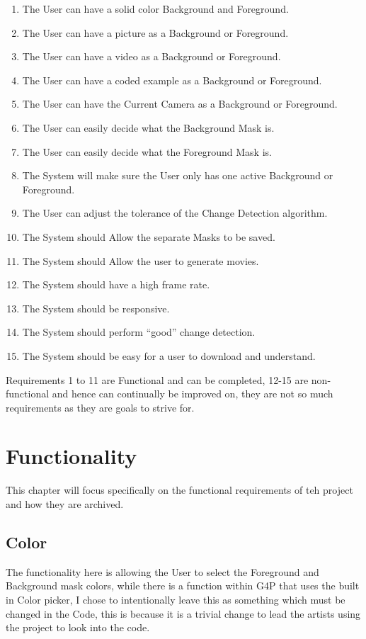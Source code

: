 \documentclass[a4paper]{report}
\begin{document}
\begin{enumerate}
\item The User can have a solid color Background and Foreground.
\item The User can have a picture as a Background or Foreground.
\item The User can have a video as a Background or Foreground.
\item The User can have a coded example as a Background or Foreground.
\item The User can have the Current Camera as a Background or Foreground.
\item The User can easily decide what the Background Mask is.
\item The User can easily decide what the Foreground Mask is.
\item The System will make sure the User only has one active Background or Foreground.
\item The User can adjust the tolerance of the Change Detection algorithm.
\item The System should Allow the separate Masks to be saved.
\item The System should Allow the user to generate movies.
\item The System should have a high frame rate.
\item The System should be responsive.
\item The System should perform “good” change detection.
\item The System should be easy for a user to download and understand.
\end{enumerate}

Requirements 1 to 11 are Functional and can be completed, 12-15 are non-functional and hence can continually be improved on, they are not so much requirements as they are goals to strive for.

\section{Functionality}
This chapter will focus specifically on the functional requirements of teh project and how they are archived.
\subsection{Color}
The functionality here is allowing the User to select the Foreground and Background mask colors, while there is a function within G4P\cite{G4P} that uses the built in Color picker, I chose to intentionally leave this as something which must be changed in the Code, this is because it is a trivial change to lead the artists using the project to look into the code.
\end{document}
